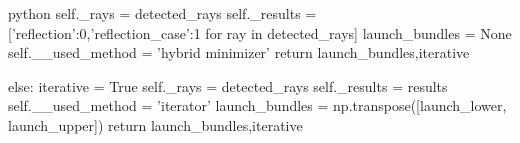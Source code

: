 \documentclass[11pt,a4paper,faculty=we,language=en,doctype=report]{cls/ugent-doc}
\begin{document}
\begin{mintedbox}{python}
            self._rays = detected_rays
            self._results =  [{'reflection':0,'reflection_case':1} for ray in detected_rays]
            launch_bundles = None 
            self.__used_method = 'hybrid minimizer'
            return launch_bundles,iterative

        else:
            iterative = True
            self._rays = detected_rays
            self._results = results
            self.__used_method = 'iterator'
            launch_bundles = np.transpose([launch_lower, launch_upper])
            return launch_bundles,iterative
\end{mintedbox}


\newpage


\end{document}

